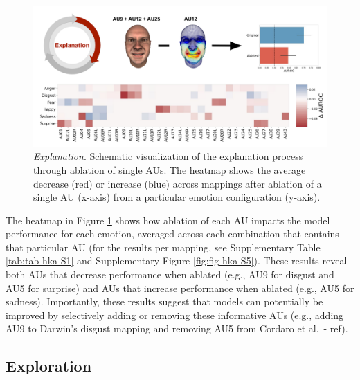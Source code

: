 \documentclass[11pt,american,a4paper,oneside,]{memoir} %
\begin{document}
\begin{figure}
\centering
\includegraphics{_bookdown_files/hypothesis-kernel-analysis-files/figures/figure_5.pdf}
\caption{\label{fig:fig-hka-5}\emph{Explanation}. Schematic visualization of the explanation process through ablation of single AUs. The heatmap shows the average decrease (red) or increase (blue) across mappings after ablation of a single AU (x-axis) from a particular emotion configuration (y-axis).}
\end{figure}



The heatmap in Figure \ref{fig:fig-hka-5} shows how ablation of each AU impacts the model performance for each emotion, averaged across each combination that contains that particular AU (for the results per mapping, see Supplementary Table \ref{tab:tab-hka-S1} and Supplementary Figure \ref{fig:fig-hka-S5}). These results reveal both AUs that decrease performance when ablated (e.g., AU9 for disgust and AU5 for surprise) and AUs that increase performance when ablated (e.g., AU5 for sadness). Importantly, these results suggest that models can potentially be improved by selectively adding or removing these informative AUs (e.g., adding AU9 to Darwin's disgust mapping and removing AU5 from Cordaro et al.~- ref).

\hypertarget{exploration}{%
\subsection{Exploration}\label{exploration}}
\end{document}
